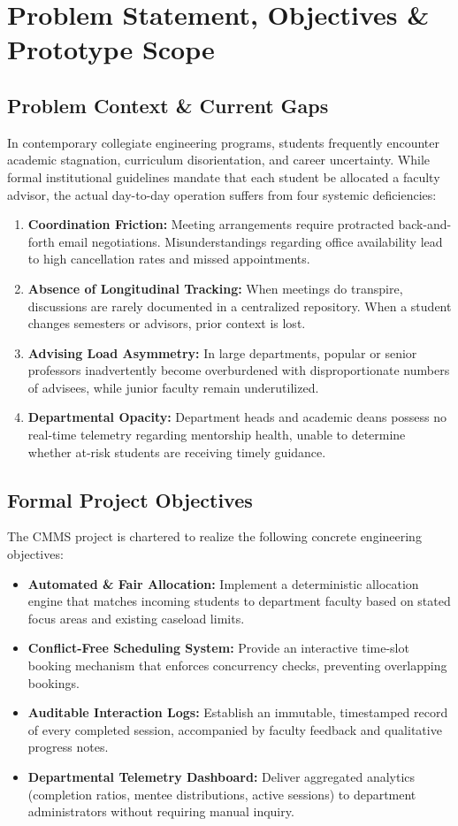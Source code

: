 \documentclass[11pt,a4paper]{article}
\begin{document}
\section{Problem Statement, Objectives \& Prototype Scope}

\subsection{Problem Context \& Current Gaps}
In contemporary collegiate engineering programs, students frequently encounter academic stagnation, curriculum disorientation, and career uncertainty. While formal institutional guidelines mandate that each student be allocated a faculty advisor, the actual day-to-day operation suffers from four systemic deficiencies:
\begin{enumerate}[leftmargin=1.4em, itemsep=0.3em]
  \item \textbf{Coordination Friction:} Meeting arrangements require protracted back-and-forth email negotiations. Misunderstandings regarding office availability lead to high cancellation rates and missed appointments.
  \item \textbf{Absence of Longitudinal Tracking:} When meetings do transpire, discussions are rarely documented in a centralized repository. When a student changes semesters or advisors, prior context is lost.
  \item \textbf{Advising Load Asymmetry:} In large departments, popular or senior professors inadvertently become overburdened with disproportionate numbers of advisees, while junior faculty remain underutilized.
  \item \textbf{Departmental Opacity:} Department heads and academic deans possess no real-time telemetry regarding mentorship health, unable to determine whether at-risk students are receiving timely guidance.
\end{enumerate}

\subsection{Formal Project Objectives}
The CMMS project is chartered to realize the following concrete engineering objectives:
\begin{itemize}[leftmargin=1.4em, itemsep=0.2em]
  \item \textbf{Automated \& Fair Allocation:} Implement a deterministic allocation engine that matches incoming students to department faculty based on stated focus areas and existing caseload limits.
  \item \textbf{Conflict-Free Scheduling System:} Provide an interactive time-slot booking mechanism that enforces concurrency checks, preventing overlapping bookings.
  \item \textbf{Auditable Interaction Logs:} Establish an immutable, timestamped record of every completed session, accompanied by faculty feedback and qualitative progress notes.
  \item \textbf{Departmental Telemetry Dashboard:} Deliver aggregated analytics (completion ratios, mentee distributions, active sessions) to department administrators without requiring manual inquiry.
\end{itemize}
\end{document}
